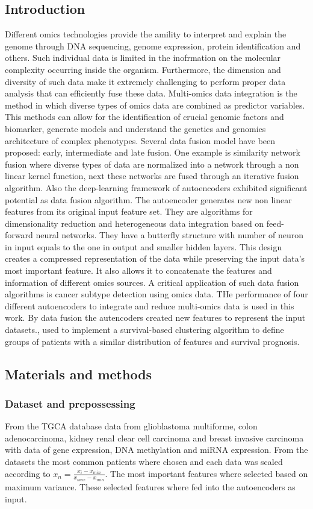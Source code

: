 	\subsection{Introduction}
	Different omics technologies provide the amility to interpret and explain the genome through DNA sequencing, genome expression, protein identification and others.
	Such individual data is limited in the inofrmation on the molecular complexity occurring inside the organism.
	Furthermore, the dimension and diversity of such data make it extremely challenging to perform proper data analysis that can efficiently fuse these data.
	Multi-omics data integration is the method in which diverse types of omics data are combined as predictor variables.
	This methods can allow for the identification of crucial genomic factors and biomarker, generate models and understand the genetics and genomics architecture of complex phenotypes.
	Several data fusion model have been proposed: early, intermediate and late fusion.
	One example is similarity network fusion where diverse types of data are normalized into a network through a non linear kernel function, next these networks are fused through an iterative fusion algorithm.
	Also the deep-learning framework of autoencoders exhibited significant potential as data fusion algorithm.
	The autoencoder generates new non linear features from its original input feature set.
	They are algorithms for dimensionality reduction and heterogeneous data integration based on feed-forward neural networks.
	They have a butterfly structure with number of neuron in input equals to the one in output and smaller hidden layers.
	This design creates a compressed representation of the data while preserving the input data's most important feature.
	It also allows it to concatenate the features and information of different omics sources.
	A critical application of such data fusion algorithms is cancer subtype detection using omics data.
	THe performance of four different autoencoders to integrate and reduce multi-omics data is used in this work.
	By data fusion the autencoders created new features to represent the input datasets., used to implement a survival-based clustering algorithm to define groups of patients with a similar distribution of features and survival prognosis.

	\subsection{Materials and methods}

		\subsubsection{Dataset and prepossessing}
		From the TGCA database data from glioblastoma multiforme, colon adenocarcinoma, kidney renal clear cell carcinoma and breast invasive carcinoma with data of gene expression, DNA methylation and miRNA expression.
		From the datasets the most common patients where chosen and each data was scaled according to $x_n = \frac{x_i-x_{min}}{x_{max} - x_{min}}$.
		The most important features where selected based on maximum variance.
		These selected features where fed into the autoencoders as input.

